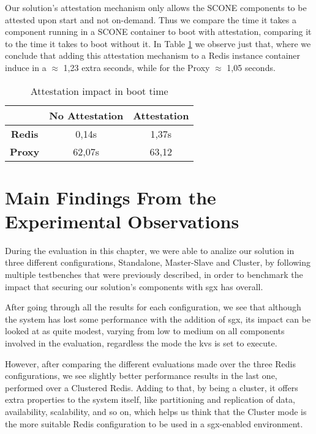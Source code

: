Our solution's attestation mechanism only allows the SCONE components to be attested upon start and not on-demand. Thus we compare the time it takes a component running in a SCONE container to boot with attestation, comparing it to the time it takes to boot without it. In Table \ref{table:attestationImpactBoot} we observe just that, where we conclude that adding this attestation mechanism to a Redis instance container induce in a $\approx$ 1,23 extra seconds, while for the Proxy $\approx$ 1,05 seconds.

\begin{table}[ht]
	\caption{Attestation impact in boot time} %
	\centering %
	\begin{tabular}{c c c} %
		\hline\hline %
		\textbf{} & \textbf{No Attestation} & \textbf{Attestation} \\ [0.5ex] %
		\hline
		\textbf{Redis} & 0,14s & 1,37s\\
		\hline %
		\textbf{Proxy} & 62,07s & 63,12\\ [1ex] %
		\hline %
	\end{tabular}
	\label{table:attestationImpactBoot} %
\end{table}

\section{Main Findings From the Experimental Observations}

During the evaluation in this chapter, we were able to analize our solution in three different configurations, Standalone, Master-Slave and Cluster, by following multiple testbenches that were previously described, in order to benchmark the impact that securing our solution's components with \gls{sgx} has overall. 

After going through all the results for each configuration, we see that although the system has lost some performance with the addition of \gls{sgx}, its impact can be looked at as quite modest, varying from low to medium on all components involved in the evaluation, regardless the mode the \gls{kvs} is set to execute. 

However, after comparing the different evaluations made over the three Redis configurations, we see slightly better performance results in the last one, performed over a Clustered Redis. Adding to that, by being a cluster, it offers extra properties to the system itself, like partitioning and replication of data, availability, scalability, and so on, which helps us think that the Cluster mode is the more suitable Redis configuration to be used in a \gls{sgx}-enabled environment.


